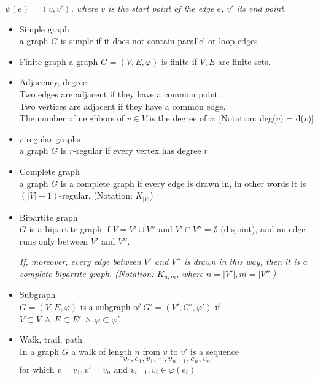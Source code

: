 \documentclass[margin=0px]{article}
\begin{document}
\begin{description}
\begin{itemize}
                  \textit{$\psi(e) = (v,v')$, where $v$ is the start point of the edge $e$, $v'$ its end point.}
        \end{itemize}
    \item[Finite, simple graphs - basic concepts] \hfill
        \begin{itemize}
            \item Simple graph \\
                  a graph $G$ is simple if it does not contain parallel or loop edges
            \item Finite graph
                  a graph $G= (V,E,\varphi)$ is finite if $V,E$ are finite sets.
            \item Adjacency, degree\\
                  Two edges are adjacent if they have a common point.\\
                  Two vertices are adjacent if they have a common edge. \\
                  The number of neighbors of $v\in V$ is the degree of $v$. [Notation: deg($v$) = d($v$)]
            \item $r$-regular graphs\\
                  a graph $G$ is $r$-regular if every vertex has degree $r$
            \item Complete graph\\
                  a graph $G$ is a complete graph if every edge is drawn in, in other words it is $(|V|-1)$-regular. (Notation: $K_{|V|}$)
            \item Bipartite graph\\
                  $G$ is a bipartite graph if $V = V' \cup V''$ and $V'\cap V'' = \emptyset$ (disjoint), and an edge runs only between $V'$ and $V''$.

                  \textit{If, moreover, every edge between $V'$ and $V''$ is drawn in this way, then it is a complete bipartite graph. (Notation: $K_{n,m}$, where $n=|V'|, m=|V''|$)}
            \item Subgraph \\
                  $G = (V,E,\varphi)$ is a subgraph of $G'=(V',G',\varphi')$ if $V\subset V \ \land \ E \subset E' \ \land \ \varphi \subset \varphi'$
            \item Walk, trail, path \\
                  In a graph $G$ a walk of length $n$ from $v$ to $v'$ is a sequence
                  \[v_0,e_1,v_1,\cdots,v_{n-1},e_n,v_n\]
                  for which $v=v_1, v'=v_n$ and $v_{i-1},v_{i} \in \varphi(e_i)$


\end{itemize}
\end{description}
\end{document}
